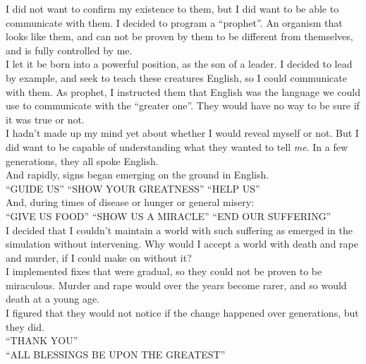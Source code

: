 \documentclass[a5paper]{scrartcl}
\begin{document}
I did not want to confirm my existence to them, but I did want to be able to communicate with them. I decided to program a \enquote{prophet}. An organism that looks like them, and can not be proven by them to be different from themselves, and is fully controlled by me.\\


I let it be born into a powerful position, as the son of a leader. I decided to lead by example, and seek to teach these creatures English, so I could communicate with them. As prophet, I instructed them that English was the language we could use to communicate with the \enquote{greater one}. They would have no way to be sure if it was true or not.\\


I hadn't made up my mind yet about whether I would reveal myself or not. But I did want to be capable of understanding what they wanted to tell \textit{me}.
In a few generations, they all spoke English.\\

And rapidly, signs began emerging on the ground in English.\\


\enquote{GUIDE US} \enquote{SHOW YOUR GREATNESS} \enquote{HELP US}\\


And, during times of disease or hunger or general misery:\\


\enquote{GIVE US FOOD} \enquote{SHOW US A MIRACLE} \enquote{END OUR SUFFERING}\\


I decided that I couldn't maintain a world with such suffering as emerged in the simulation without intervening. Why would I accept a world with death and rape and murder, if I could make on without it? \\


I implemented fixes that were gradual, so they could not be proven to be miraculous. Murder and rape would over the years become rarer, and so would death at a young age.\\


I figured that they would not notice if the change happened over generations, but they did. \\


\enquote{THANK YOU}\\


\enquote{ALL BLESSINGS BE UPON THE GREATEST}\\
\end{document}
